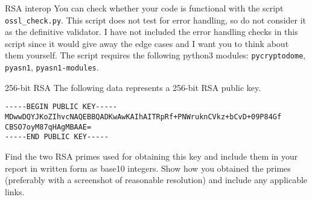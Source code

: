 \documentclass{homework}
\begin{document}
\begin{task}{RSA interop}
  You can check whether your code is functional with the script \texttt{ossl\_check.py}.
  This script does not test for error handling, so do not consider it as the definitive validator.
  I have not included the error handling checks in this script since it would give away the edge cases and I want you to think about them yourself.
  The script requires the following python3 modules: \texttt{pycryptodome}, \texttt{pyasn1}, \texttt{pyasn1-modules}.

  \iffalse
  \begin{tcolorbox}[title=Reading comprehension]
    Beware!
    If you submit a homework which:
    \begin{itemize}
      \item does not pass the test script \textbf{and}
      \item do not mention this in your report \textbf{and}
      \item do not describe in your report what you tried and what problems you still have,
    \end{itemize}
    I will consider your homework as unsubmitted for grading.
    If the deadline hits with your homework in this state, you fail the homework.
    \tcblower
    Motivation: in cryptography (and cybersecurity in general), paying close attention to details is crucial.
    If you cannot be bothered to pay attention and check whether things work, you should not work in cryptography.
  \end{tcolorbox}
  \fi
\end{task}

\begin{task}{256-bit RSA}
  The following data represents a 256-bit RSA public key.
  \begin{Verbatim}
-----BEGIN PUBLIC KEY-----
MDwwDQYJKoZIhvcNAQEBBQADKwAwKAIhAITRpRf+PNWruknCVkz+bCvD+09P84Gf
CBSO7oyM87qHAgMBAAE=
-----END PUBLIC KEY-----
  \end{Verbatim}
  Find the two RSA primes used for obtaining this key and include them in your report in written form as base10 integers.
  Show how you obtained the primes (preferably with a screenshot of reasonable resolution) and include any applicable links.
\end{task}

\newpage
\end{document}
